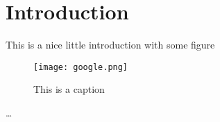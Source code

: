 
\chapter{Introduction}
\label{ch:Introduction}

This is a nice little introduction with some figure
\begin{figure}[htp]
\begin{center}
  \texttt{[image: google.png]}
\caption{This is a caption}
\end{center}
\end{figure} 

\citet{Becker2008}


\citep{Becker2008}


\citep{EC2012ND}


\citet{EC2012ND}

\cite{EC2012ND}

\dots

